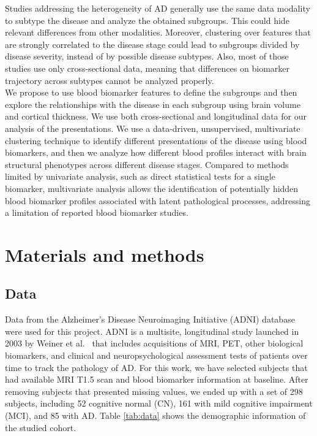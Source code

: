 Studies addressing the heterogeneity of AD generally use the same data modality to subtype the disease and analyze the obtained subgroups. This could hide relevant differences from other modalities. Moreover, clustering over features that are strongly correlated to the disease stage could lead to subgroups divided by disease severity, instead of by possible disease subtypes. Also, most of those studies use only cross-sectional data, meaning that differences on biomarker trajectory across subtypes cannot be analyzed properly. \\

We propose to use blood biomarker features to define the subgroups and then explore the relationships with the disease in each subgroup using brain volume and cortical thickness. We use both cross-sectional and longitudinal data for our analysis of the presentations. We use a data-driven, unsupervised, multivariate clustering technique \cite{Ramazzotti2018} to identify different presentations of the disease using blood biomarkers, and then we analyze how different blood profiles interact with brain structural phenotypes across different disease stages. Compared to methods limited by univariate analysis, such as direct statistical tests for a single biomarker, multivariate analysis allows the identification of potentially hidden blood biomarker profiles associated with latent pathological processes, addressing a limitation of reported blood biomarker studies. \\


\section{Materials and methods}
\subsection*{Data}
\label{data}

Data from the Alzheimer's Disease Neuroimaging Initiative (ADNI) database were used for this project. ADNI is a multisite, longitudinal study launched in 2003 by Weiner et al.\ \cite{Mueller2005} that includes acquisitions of MRI, PET, other biological biomarkers, and clinical and neuropsychological assessment tests of patients over time to track the pathology of AD. For this work, we have selected subjects that had available  MRI T1.5 scan and blood biomarker information at baseline. After removing subjects that presented missing values, we ended up with a set of 298 subjects, including 52 cognitive normal (CN), 161 with mild cognitive impairment (MCI), and 85 with AD. Table \ref{tab:data} shows the demographic information of the studied cohort. \\

